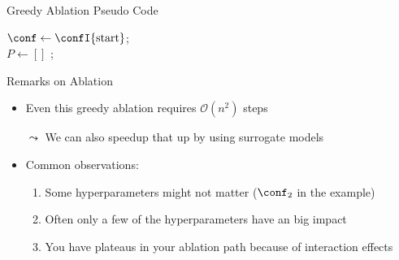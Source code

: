 \begin{frame}[c,fragile]{Greedy Ablation Pseudo Code}

\LinesNotNumbered
\begin{algorithm}[H]
	\BlankLine
	$\conf \leftarrow  \confI{\text{start}}$; \\
	$P \leftarrow [] $ ;\\ 
	\pause
	\pause
	\caption{Greedy Ablation}
	\end{algorithm}
	
\end{frame}
\begin{frame}[c,fragile]{Remarks on Ablation}

\begin{itemize}
	\item Even this greedy ablation requires $\mathcal{O}(n^2)$ steps 
	\pause
	\item[$\leadsto$] We can also speedup that up by using surrogate models\\
	\medskip
	\pause
	\item Common observations:
	\begin{enumerate}
		\item Some hyperparameters might not matter ($\conf_{2}$ in the example)
		\pause
		\item Often only a few of the hyperparameters have an big impact
		\pause
		\item You have plateaus in your ablation path because of interaction effects
	\end{enumerate}
\end{itemize}

\end{frame}



